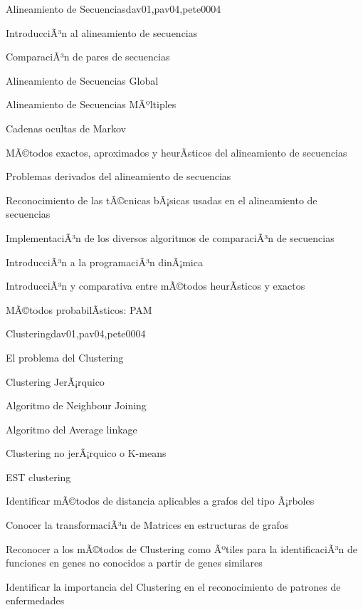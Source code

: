 \begin{syllabus}
\begin{unit}{Alineamiento de Secuencias}{dav01,pav04,pete00}{0}{4}
\begin{topics}
        \item IntroducciÃ³n al alineamiento de secuencias
        \item ComparaciÃ³n de pares de secuencias
        \item Alineamiento de Secuencias Global
        \item Alineamiento de Secuencias MÃºltiples
        \item Cadenas ocultas de Markov
        \item MÃ©todos exactos, aproximados y heurÃ­sticos del alineamiento de secuencias
        \item Problemas derivados del alineamiento de secuencias
    \end{topics}
    \begin{unitgoals}
        \item Reconocimiento de las tÃ©cnicas bÃ¡sicas usadas en el alineamiento de secuencias
        \item ImplementaciÃ³n de los diversos algoritmos de comparaciÃ³n de secuencias
        \item IntroducciÃ³n a la programaciÃ³n dinÃ¡mica
        \item IntroducciÃ³n y comparativa entre mÃ©todos heurÃ­sticos y exactos
        \item MÃ©todos probabilÃ­sticos: PAM
    \end{unitgoals}
\end{unit}

\begin{unit}{Clustering}{dav01,pav04,pete00}{0}{4}
\begin{topics}
        \item El problema del Clustering
        \item Clustering JerÃ¡rquico
        \item Algoritmo de Neighbour Joining
        \item Algoritmo del Average linkage
        \item Clustering no jerÃ¡rquico o K-means
        \item EST clustering
    \end{topics}
    \begin{unitgoals}
        \item Identificar mÃ©todos de distancia aplicables a grafos del tipo Ã¡rboles
        \item Conocer la transformaciÃ³n de Matrices en estructuras de grafos
        \item Reconocer a los mÃ©todos de Clustering como Ãºtiles para la identificaciÃ³n de funciones en genes no conocidos a partir de genes similares
        \item Identificar la importancia del Clustering en el reconocimiento de patrones de enfermedades
    \end{unitgoals}
\end{unit}


\end{syllabus}
